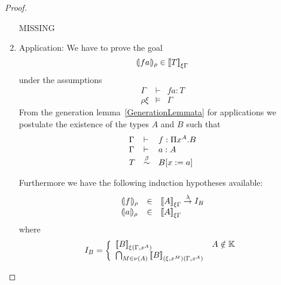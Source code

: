 \begin{theorem}
\begin{proof}
\begin{enumerate}
            MISSING

        \item Application: We have to prove the goal
            $$
            {(\!|f a|\!)_{\rho}} \in {{[\![}T{]\!]}}_{\xi\Gamma}
            $$
            under the assumptions
            $$
            \begin{array}{lll}
                \Gamma &\vdash& f a : T
                \\
                \rho\xi &\vDash& \Gamma
            \end{array}
            $$
            From the generation lemma~\ref{GenerationLemmata} for applications
            we postulate the existence of the types $A$ and $B$ such that
            $$
            \begin{array}{lll}
                \Gamma &\vdash& f : \Pi x^A.B
                \\
                \Gamma &\vdash& a : A
                \\
                T &\stackrel{\beta}{\sim}& B[x:=a]
            \end{array}
            $$

            Furthermore we have the following induction hypotheses available:
            $$
            \begin{array}{lll}
                \terminter{f}{\rho}
                &\in& \typeinter{A}{\xi\Gamma} \tolambda I_B
                \\
                \terminter{a}{\rho} &\in& \typeinter{A}{\xi\Gamma}
            \end{array}
            $$
            where
            $$
            I_B =
            \left\{
            \begin{array}{ll}
                {{[\![}B{]\!]}}_{\xi(\Gamma,x^A)}
                & A \notin \mathbb{K}
                \\
                \bigcap_{M \in \nu(A)}
                {{[\![} B{]\!]}}_{(\xi,x^M)(\Gamma,x^A)}
            \end{array}
            \right.
            $$


\end{enumerate}
\end{proof}
\end{theorem}
